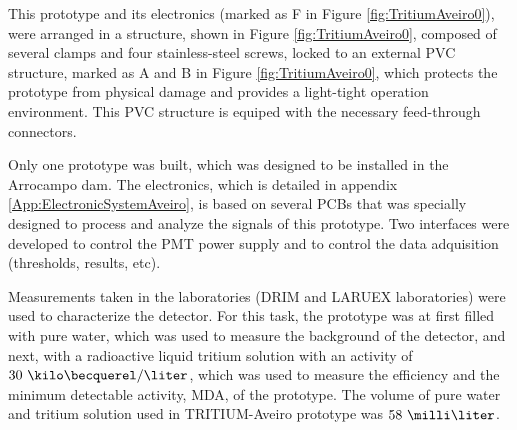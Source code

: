 This prototype and its electronics (marked as F in Figure \ref{fig:TritiumAveiro0}), were arranged in a structure, shown in Figure \ref{fig:TritiumAveiro0}, composed of several clamps and four stainless-steel screws, locked to an external PVC structure, marked as A and B in Figure \ref{fig:TritiumAveiro0}, which protects the prototype from physical damage and provides a light-tight operation environment. This PVC structure is equiped with the necessary feed-through connectors.

Only one prototype was built, which was designed to be installed in the Arrocampo dam. The electronics, which is detailed in appendix \ref{App:ElectronicSystemAveiro}, is based on several PCBs that was specially designed to process and analyze the signals of this prototype. Two interfaces were developed to control the PMT power supply and to control the data adquisition (thresholds, results, etc). 

Measurements taken in the laboratories (DRIM and LARUEX laboratories) were used to characterize the detector. For this task, the prototype was at first filled with pure water, which was used to measure the background of the detector, and next, with a radioactive liquid tritium solution with an activity of $30~\kilo\becquerel/\liter$, which was used to measure the efficiency and the minimum detectable activity, MDA, of the prototype. The volume of pure water and tritium solution used in TRITIUM-Aveiro prototype was $58~\milli\liter$. 



